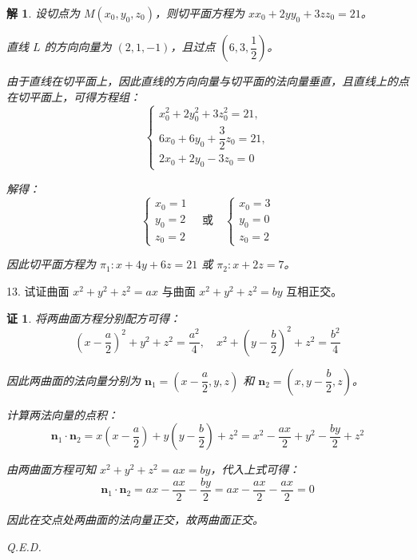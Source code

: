 \documentclass[a4paper,12pt]{article}
\newtheorem*{pf}{证}
\newtheorem*{sol}{解}
\begin{document}
\begin{sol}
    设切点为 $M(x_0,y_0,z_0)$，则切平面方程为 $xx_0+2yy_0+3zz_0=21$。

    直线 $L$ 的方向向量为 $(2,1,-1)$，且过点 $\left(6,3,\dfrac{1}{2}\right)$。

    由于直线在切平面上，因此直线的方向向量与切平面的法向量垂直，且直线上的点在切平面上，可得方程组：
    $$\begin{cases}
            x_0^2+2y_0^2+3z_0^2=21,       \\
            6x_0+6y_0+\dfrac{3}{2}z_0=21, \\
            2x_0+2y_0-3z_0=0
        \end{cases}$$

    解得：
    $$\begin{cases}
            x_0=1 \\
            y_0=2 \\
            z_0=2
        \end{cases}\quad\text{或}\quad\begin{cases}
            x_0=3 \\
            y_0=0 \\
            z_0=2
        \end{cases}$$

    因此切平面方程为 $\pi_1:x+4y+6z=21$ 或 $\pi_2:x+2z=7$。
\end{sol}

13. 试证曲面 $x^2+y^2+z^2=ax$ 与曲面 $x^2+y^2+z^2=by$ 互相正交。

\begin{pf}
    将两曲面方程分别配方可得：
    $$\left(x-\frac{a}{2}\right)^2+y^2+z^2=\frac{a^2}{4},\quad x^2+\left(y-\frac{b}{2}\right)^2+z^2=\frac{b^2}{4}$$

    因此两曲面的法向量分别为 $\boldsymbol{n}_1=\left(x-\dfrac{a}{2},y,z\right)$ 和 $\boldsymbol{n}_2=\left(x,y-\dfrac{b}{2},z\right)$。

    计算两法向量的点积：
    $$\boldsymbol{n}_1\cdot\boldsymbol{n}_2=x\left(x-\frac{a}{2}\right)+y\left(y-\frac{b}{2}\right)+z^2=x^2-\frac{ax}{2}+y^2-\frac{by}{2}+z^2$$

    由两曲面方程可知 $x^2+y^2+z^2=ax=by$，代入上式可得：
    $$\boldsymbol{n}_1\cdot\boldsymbol{n}_2=ax-\frac{ax}{2}-\frac{by}{2}=ax-\frac{ax}{2}-\frac{ax}{2}=0$$

    因此在交点处两曲面的法向量正交，故两曲面正交。

    Q.E.D.
\end{pf}
\end{document}
